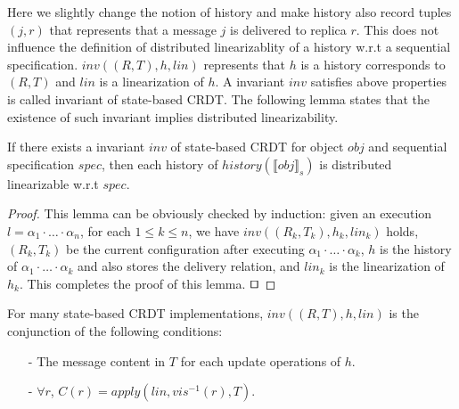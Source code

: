 Here we slightly change the notion of history and make history also record tuples $(j,r)$ that represents that a message $j$ is delivered to replica $r$. This does not influence the definition of distributed linearizablity of a history w.r.t a sequential specification. $\mathit{inv}((R, T),h,\mathit{lin})$ represents that $h$ is a history corresponds to $(R,T)$ and $\mathit{lin}$ is a linearization of $h$. A invariant $\mathit{inv}$ satisfies above properties is called invariant of state-based CRDT. The following lemma states that the existence of such invariant implies distributed linearizability. 


\begin{lemma}
\label{lemma:invariant of state-based CRDT implies distributed linearizability} 
If there exists a invariant $\mathit{inv}$ of state-based CRDT for object $\mathit{obj}$ and sequential specification $\mathit{spec}$, then each history of $\mathit{history}(\llbracket \mathit{obj} \rrbracket_s)$ is distributed linearizable w.r.t $\mathit{spec}$. 
\end{lemma} 

\begin {proof}  
This lemma can be obviously checked by induction: given an execution $l=\alpha_1 \cdot \ldots \cdot \alpha_n$, for each $1 \leq k \leq n$, we have $\mathit{inv}((R_k,T_k),h_k,\mathit{lin}_k)$ holds, $(R_k,T_k)$ be the current configuration after executing $\alpha_1 \cdot \ldots \cdot \alpha_k$, $h$ is the history of $\alpha_1 \cdot \ldots \cdot \alpha_k$ and also stores the delivery relation, and $\mathit{lin}_k$ is the linearization of $h_k$. This completes the proof of this lemma. $\qed$ 
\end {proof}




For many state-based CRDT implementations, $\mathit{inv}((R, T), h, \mathit{lin})$ is the conjunction of the following conditions: 

\begin{itemize}
\setlength{\itemsep}{0.5pt} 
\item[-] The message content in $T$ for each update operations of $h$. 
 
\item[-] $\forall r$, $C(r) = \mathit{apply}(\mathit{lin},\mathit{vis}^{-1}(r),T)$.  
\end{itemize} 

